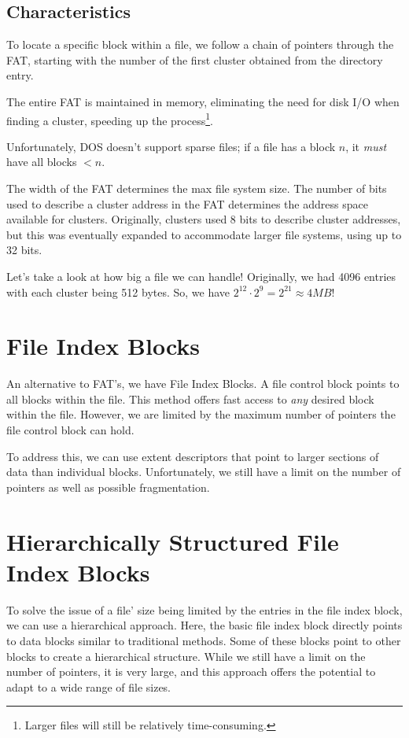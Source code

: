 \documentclass{report}
\newcommand{\exampleBegin}[1]{\begin{tcolorbox}[colback=blue!5!white,colframe=black!75!blue,title={Example:
      #1}]}
\newcommand{\exampleEnd}{\end{tcolorbox}}
\begin{document}
\subsection{Characteristics}
To locate a specific block within a file, we follow a chain of pointers through the FAT, starting
with the number of the first cluster obtained from the directory entry.

The entire FAT is maintained in memory, eliminating the need for disk I/O when finding a cluster,
speeding up the process\footnote{Larger files will still be relatively time-consuming.}.

Unfortunately, DOS doesn't support sparse files; if a file has a block $n$, it \textit{must} have
all blocks $< n$.

The width of the FAT determines the max file system size. The number of bits used to describe a
cluster address in the FAT determines the address space available for clusters. Originally, clusters
used 8 bits to describe cluster addresses, but this was eventually expanded to accommodate larger
file systems, using up to 32 bits.


\exampleBegin{File Size}
Let's take a look at how big a file we can handle! Originally, we had 4096 entries with each cluster
being 512 bytes. So, we have $2^{12} \cdot 2^9 = 2^{21} \approx 4MB$!
\exampleEnd


\section{File Index Blocks}
An alternative to FAT's, we have File Index Blocks. A file control block points to all blocks within
the file. This method offers fast access to \textit{any} desired block within the file. However, we
are limited by the maximum number of pointers the file control block can hold.

To address this, we can use extent descriptors that point to larger sections of data than individual
blocks. Unfortunately, we still have a limit on the number of pointers as well as possible fragmentation.


\section{Hierarchically Structured File Index Blocks}
To solve the issue of a file' size being limited by the entries in the file index block, we can use
a hierarchical approach. Here, the basic file index block directly points to data blocks similar to
traditional methods. Some of these blocks point to other blocks to create a hierarchical
structure. While we still have a limit on the number of pointers, it is very large, and this
approach offers the potential to adapt to a wide range of file sizes.
\end{document}
